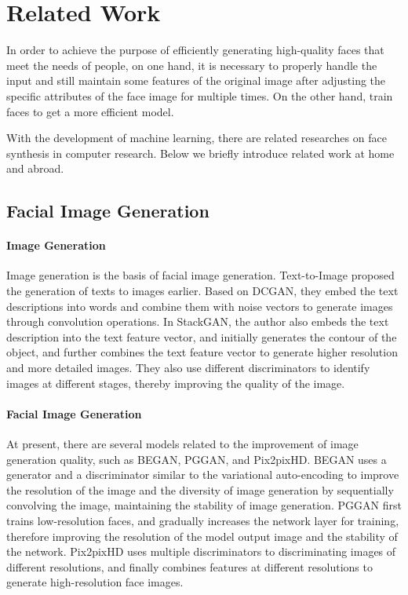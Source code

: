 \section{Related Work}

In order to achieve the purpose of efficiently generating high-quality faces that meet the needs of people, on one hand,
    it is necessary to properly handle the input and still maintain some features of the original image after adjusting the specific attributes of the face image for multiple times.
On the other hand, train faces to get a more efficient model.

With the development of machine learning, there are related researches on face synthesis in computer research.
Below we briefly introduce related work at home and abroad.

\subsection{Facial Image Generation}

\paragraph{Image Generation}

Image generation is the basis of facial image generation.
Text-to-Image proposed the generation of texts to images earlier.
Based on DCGAN, they embed the text descriptions into words and combine them with noise vectors to generate images through convolution operations.
In StackGAN, the author also embeds the text description into the text feature vector,
    and initially generates the contour of the object,
    and further combines the text feature vector to generate higher resolution and more detailed images.
They also use different discriminators to identify images at different stages, thereby improving the quality of the image.


\paragraph{Facial Image Generation}

At present, there are several models related to the improvement of image generation quality,
    such as BEGAN, PGGAN, and Pix2pixHD.
BEGAN uses a generator and a discriminator similar to the variational auto-encoding to improve the resolution of the image and the diversity of image generation by sequentially convolving the image,
    maintaining the stability of image generation.
PGGAN first trains low-resolution faces,
    and gradually increases the network layer for training,
    therefore improving the resolution of the model output image and the stability of the network.
Pix2pixHD uses multiple discriminators to discriminating images of different resolutions,
    and finally combines features at different resolutions to generate high-resolution face images.


